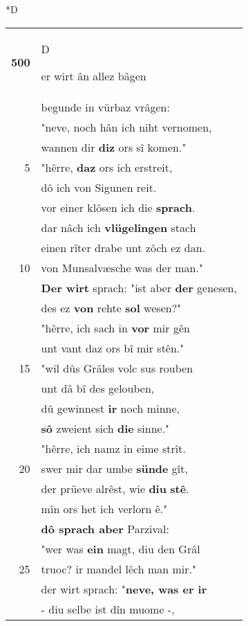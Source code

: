 \documentclass[8pt,a4paper,notitlepage]{article}
\begin{document}
\begin{table}[ht]
\begin{minipage}[t]{0.5\linewidth}
\small
\begin{center}*D
\end{center}
\begin{tabular}{rl}
\textbf{500} & \begin{large}D\end{large}er wirt ân allez bâgen\\ 
 & begunde in vürbaz vrâgen:\\ 
 & "neve, noch hân ich niht vernomen,\\ 
 & wannen dir \textbf{diz} ors sî komen."\\ 
5 & "hêrre, \textbf{daz} ors ich erstreit,\\ 
 & dô ich von Sigunen reit.\\ 
 & vor einer klôsen ich die \textbf{sprach}.\\ 
 & dar nâch ich \textbf{vlügelingen} stach\\ 
 & einen rîter drabe unt zôch ez dan.\\ 
10 & von Munsalvæsche was der man."\\ 
 & \textbf{Der wirt} sprach: "ist aber \textbf{der} genesen,\\ 
 & des ez \textbf{von} rehte \textbf{sol} wesen?"\\ 
 & "hêrre, ich sach in \textbf{vor} mir gên\\ 
 & unt vant daz ors bî mir stên."\\ 
15 & "wil dûs Grâles volc sus rouben\\ 
 & unt dâ bî des gelouben,\\ 
 & dû gewinnest \textbf{ir} noch minne,\\ 
 & \textbf{sô} zweient sich \textbf{die} sinne."\\ 
 & "hêrre, ich namz in eime strît.\\ 
20 & swer mir dar umbe \textbf{sünde} gît,\\ 
 & der prüeve alrêst, wie \textbf{diu} \textbf{stê}.\\ 
 & mîn ors het ich verlorn ê."\\ 
 & \textbf{dô sprach aber} Parzival:\\ 
 & "wer was \textbf{ein} magt, diu den Grâl\\ 
25 & truoc? ir mandel lêch man mir."\\ 
 & der wirt sprach: "\textbf{neve, was er ir}\\ 
 & - diu selbe ist dîn muome -,\\ 

\end{tabular}
\end{minipage}
\end{table}
\end{document}
